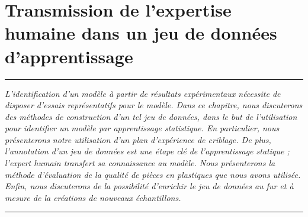 
\lhead[\fancyplain{}{\leftmark}]%
      {\fancyplain{}{}} %
\chead[\fancyplain{}{}]%
      {\fancyplain{}{}}
\rhead[\fancyplain{}{}]%
      {\fancyplain{}{\rightmark}}%
\lfoot[\fancyplain{}{}]%
      {\fancyplain{}{}}
\cfoot[\fancyplain{}{\thepage}]%
      {\fancyplain{}{\thepage}} %
\rfoot[\fancyplain{}{}]%
     {\fancyplain{}{\scriptsize}}



\chapter{Transmission de l'expertise humaine dans un jeu de données d'apprentissage}
\label{ch:dataset}


\begin{center}
\rule{0.7\linewidth}{.5pt}
\begin{minipage}{0.7\linewidth}
\smallskip

\textit{
	L'identification d'un modèle à partir de résultats expérimentaux nécessite de disposer d'essais représentatifs pour le modèle.
	Dans ce chapitre, nous discuterons des méthodes de construction d'un tel jeu de données, dans le but de l'utilisation pour identifier un modèle par apprentissage statistique.
	En particulier, nous présenterons notre utilisation d'un plan d'expérience de criblage.
	De plus, l'annotation d'un jeu de données est une étape clé de l'apprentissage statique ; l'expert humain transfert sa connaissance au modèle.
	Nous présenterons la méthode d'évaluation de la qualité de pièces en plastiques que nous avons utilisée.
	Enfin, nous discuterons de la possibilité d'enrichir le jeu de données au fur et à mesure de la créations de nouveaux échantillons.
}

\end{minipage}
\smallskip
\rule{0.7\linewidth}{.5pt}
\end{center}

